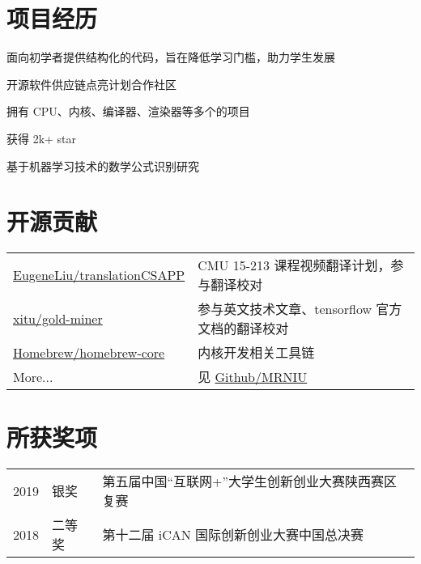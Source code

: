 \documentclass[]{deedy-resume-openfont}
\begin{document}
\begin{minipage}[t]{0.73\textwidth}
\section{项目经历}
\begin{tightemize}
    \item 面向初学者提供结构化的代码，旨在降低学习门槛，助力学生发展
    \item 开源软件供应链点亮计划合作社区
    \item 拥有 CPU、内核、编译器、渲染器等多个的项目
    \item 获得 2k+ star
    \end{tightemize}
\sectionsep

\begin{tightemize}
    \item 基于机器学习技术的数学公式识别研究
    \end{tightemize}
\sectionsep


\section{开源贡献}
\begin{tabular}{ll}
    \href{https://github.com/EugeneLiu/translationCSAPP}{EugeneLiu/translationCSAPP} & CMU 15-213 课程视频翻译计划，参与翻译校对 \\
    \href{https://github.com/xitu/gold-miner}{xitu/gold-miner} & 参与英文技术文章、tensorflow 官方文档的翻译校对 \\
    \href{https://github.com/Homebrew/homebrew-core}{Homebrew/homebrew-core} & 内核开发相关工具链 \\
    More... & 见 \href{https://github.com/MRNIU}{Github/MRNIU}
\end{tabular}
\sectionsep


\section{所获奖项} 
\begin{tabular}{rll}
    2019         & 银奖    & 第五届中国“互联网+”大学生创新创业大赛陕西赛区复赛 \\
    2018	     & 二等奖  & 第十二届 iCAN 国际创新创业大赛中国总决赛 \\
\end{tabular}
\sectionsep


% 
% 

\end{minipage} 
\end{document}
